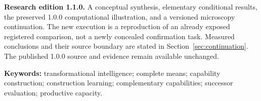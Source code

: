 \documentclass[11pt,letterpaper]{article}
\theoremstyle{remark}\newtheorem{remark}{Remark}[section]
\begin{document}
\begin{statusbox}
\textbf{Research edition 1.1.0.} A conceptual synthesis, elementary conditional results, the preserved 1.0.0 computational illustration, and a versioned microscopy continuation. The new execution is a reproduction of an already exposed registered comparison, not a newly concealed confirmation task. Measured conclusions and their source boundary are stated in Section~\ref{sec:continuation}. The published 1.0.0 source and evidence remain available unchanged.
\end{statusbox}
{\small\textbf{Keywords:} transformational intelligence; complete means; capability construction; construction learning; complementary capabilities; successor evaluation; productive capacity.}
\clearpage

\clearpage
\tableofcontents
\clearpage










\clearpage
\begingroup\small
\setlength{\bibsep}{5pt}


\endgroup
\end{document}
